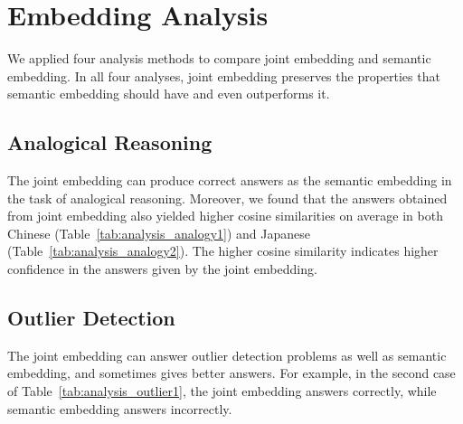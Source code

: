 \section{Embedding Analysis} \label{sec:analysis}

We applied four analysis methods to compare joint embedding and semantic embedding. In all four analyses, joint embedding preserves the properties that semantic embedding should have and even outperforms it.

\subsection{Analogical Reasoning} \label{sec:analysis_analogy}

The joint embedding can produce correct answers as the semantic embedding in the task of analogical reasoning. Moreover, we found that the answers obtained from joint embedding also yielded higher cosine similarities on average in both Chinese (Table~\ref{tab:analysis_analogy1}) and Japanese (Table~\ref{tab:analysis_analogy2}). The higher cosine similarity indicates higher confidence in the answers given by the joint embedding.

\subsection{Outlier Detection} \label{sec:analysis_outlier}

\begin{CJK}{UTF8}{gbsn}    
The joint embedding can answer outlier detection problems as well as semantic embedding, and sometimes gives better answers. For example, in the second case of Table~\ref{tab:analysis_outlier1}, the joint embedding answers correctly, while semantic embedding answers incorrectly.
\end{CJK}

